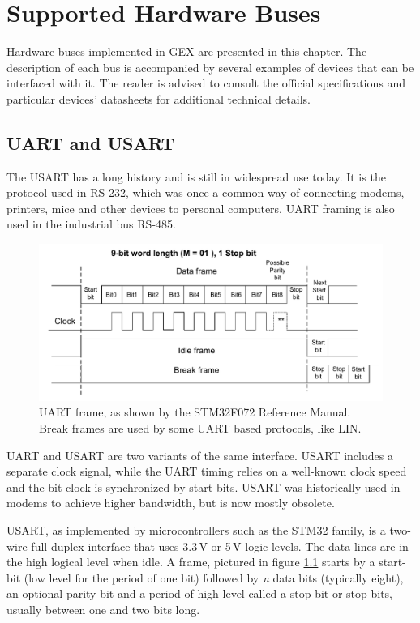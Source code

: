 \chapter{Supported Hardware Buses} \label{ch:hw_buses}

Hardware buses implemented in GEX are presented in this chapter. The description of each bus is accompanied by several examples of devices that can be interfaced with it. The reader is advised to consult the official specifications and particular devices' datasheets for additional technical details.

\section{UART and USART} \label{sec:theory-usart}

The \gls{USART} has a long history and is still in widespread use today. It is the protocol used in RS-232, which was once a common way of connecting modems, printers, mice and other devices to personal computers. \gls{UART} framing is also used in the industrial bus RS-485.

\begin{figure}[h]
	\centering
	\includegraphics[width=.8\textwidth] {img/usart.png}
	\caption[UART frame structure]{\label{fig:uart-frame}\gls{UART} frame, as shown by the STM32F072 Reference Manual. Break frames are used by some \gls{UART} based protocols, like \gls{LIN}.}
\end{figure}

\gls{UART} and \gls{USART} are two variants of the same interface. \gls{USART} includes a separate clock signal, while the \gls{UART} timing relies on a well-known clock speed and the bit clock is synchronized by start bits. \gls{USART} was historically used in modems to achieve higher bandwidth, but is now mostly obsolete.

\gls{USART}, as implemented by microcontrollers such as the STM32 family, is a two-wire full duplex interface that uses 3.3\,V or 5\,V logic levels. The data lines are in the high logical level when idle. A frame, pictured in figure \ref{fig:uart-frame} starts by a start-bit (low level for the period of one bit) followed by \textit{n} data bits (typically eight), an optional parity bit and a period of high level called a stop bit or stop bits, usually between one and two bits long.
 
